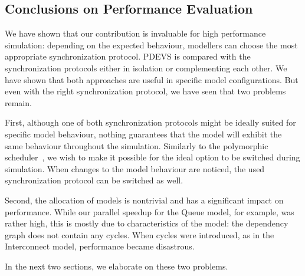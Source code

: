 \subsection{Conclusions on Performance Evaluation}
We have shown that our contribution is invaluable for high performance simulation: depending on the expected behaviour, modellers can choose the most appropriate synchronization protocol.
PDEVS is compared with the synchronization protocols either in isolation or complementing each other. We have shown that both approaches are useful in specific model configurations.
But even with the right synchronization protocol, we have seen that two problems remain.

First, although one of both synchronization protocols might be ideally suited for specific model behaviour, nothing guarantees that the model will exhibit the same behaviour throughout the simulation.
Similarly to the polymorphic scheduler~\cite{MasterThesis}, we wish to make it possible for the ideal option to be switched during simulation.
When changes to the model behaviour are noticed, the used synchronization protocol can be switched as well. 

Second, the allocation of models is nontrivial and has a significant impact on performance.
While our parallel speedup for the Queue model, for example, was rather high, this is mostly due to characteristics of the model: the dependency graph does not contain any cycles.
When cycles were introduced, as in the Interconnect model, performance became disastrous.

In the next two sections, we elaborate on these two problems.
